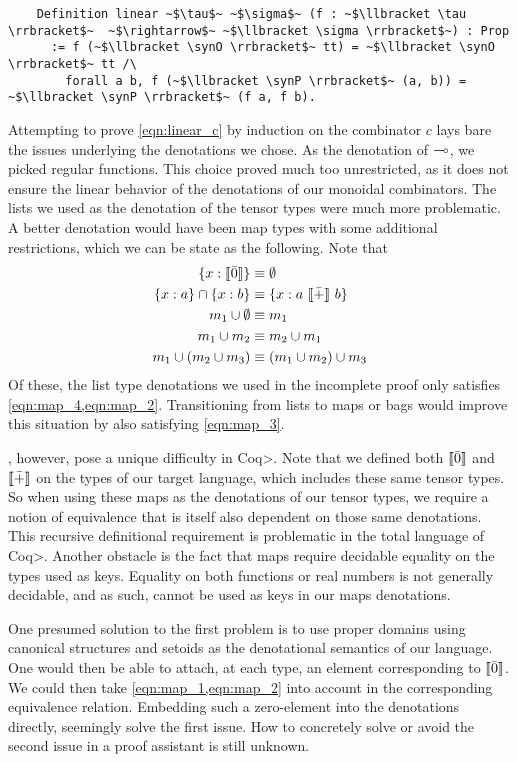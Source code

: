   \begin{verbatim}
    Definition linear ~$\tau$~ ~$\sigma$~ (f : ~$\llbracket \tau \rrbracket$~  ~$\rightarrow$~ ~$\llbracket \sigma \rrbracket$~) : Prop
      := f (~$\llbracket \synO \rrbracket$~ tt) = ~$\llbracket \synO \rrbracket$~ tt /\
        forall a b, f (~$\llbracket \synP \rrbracket$~ (a, b)) = ~$\llbracket \synP \rrbracket$~ (f a, f b).
  \end{verbatim}

  Attempting to prove \cref{eqn:linear_c} by induction on the combinator $c$ lays bare the issues underlying the denotations we chose.
  As the denotation of $\multimap$, we picked regular functions.
  This choice proved much too unrestricted, as it does not ensure the linear behavior of the denotations of our monoidal combinators.
  The lists we used as the denotation of the tensor types were much more problematic.
  A better denotation would have been map types with some additional restrictions, which we can be state as the following.
  Note that
  \begin{align}
    \{ x : \llbracket \bar{0} \rrbracket \} &\equiv \emptyset \label{eqn:map_1}\\
    \{ x : a \} \cap \{ x : b \} &\equiv \{ x : a\ \llbracket \bar{+} \rrbracket\ b \} \label{eqn:map_5}\\
    m_1 \cup \emptyset &\equiv m_1 \label{eqn:map_2}\\
    m_1 \cup m_2 &\equiv m_2 \cup m_1 \label{eqn:map_3}\\
    m_1 \cup (m_2 \cup m_3) &\equiv (m_1 \cup m_2) \cup m_3 \label{eqn:map_4}
  \end{align}
  Of these, the list type denotations we used in the incomplete proof only satisfies \cref{eqn:map_4,eqn:map_2}.
  Transitioning from lists to maps or bags would improve this situation by also satisfying \cref{eqn:map_3}.

  , however, pose a unique difficulty in \<Coq>.
  Note that we defined both $\llbracket \bar{0} \rrbracket$ and $\llbracket \bar{+} \rrbracket$ on the types of our target language, which includes these same tensor types.
  So when using these maps as the denotations of our tensor types, we require a notion of equivalence that is itself also dependent on those same denotations.
  This recursive definitional requirement is problematic in the total language of \<Coq>.
  Another obstacle is the fact that maps require decidable equality on the types used as keys.
  Equality on both functions or real numbers is not generally decidable, and as such, cannot be used as keys in our maps denotations.

  One presumed solution to the first problem is to use proper domains using canonical structures and setoids as the denotational semantics of our language.
  One would then be able to attach, at each type, an element corresponding to $\llbracket \bar{0} \rrbracket$.
  We could then take \cref{eqn:map_1,eqn:map_2} into account in the corresponding equivalence relation.
  Embedding such a zero-element into the denotations directly, seemingly solve the first issue.
  How to concretely solve or avoid the second issue in a proof assistant is still unknown.
